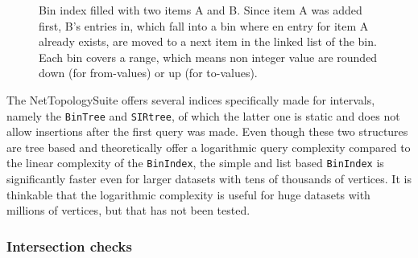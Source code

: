 \begin{figure}[h]
\begin{figcenter}
					\end{figcenter}
					\caption{Bin index filled with two items A and B. Since item A was added first, B's entries in, which fall into a bin where en entry for item A already exists, are moved to a next item in the linked list of the bin. Each bin covers a range, which means non integer value are rounded down (for from-values) or up (for to-values).}
					\label{fig:bin-index}
				\end{figure}
				
				The NetTopologySuite offers several indices specifically made for intervals, namely the \texttt{BinTree} and \texttt{SIRtree}, of which the latter one is static and does not allow insertions after the first query was made.
				Even though these two structures are tree based and theoretically offer a logarithmic query complexity compared to the linear complexity of the \texttt{BinIndex}, the simple and list based \texttt{BinIndex} is significantly faster even for larger datasets with tens of thousands of vertices.
				It is thinkable that the logarithmic complexity is useful for huge datasets with millions of vertices, but that has not been tested.
			
			\subsubsection{Intersection checks}
			\label{subsubsec:intersection-checks}
			
